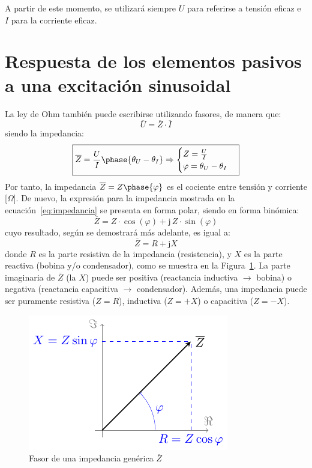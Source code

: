 \begin{remark}
  A partir de este momento, se utilizará siempre $U$ para referirse a
  tensión eficaz e $I$ para la corriente eficaz.
\end{remark}
	
\section{Respuesta de los elementos pasivos a una excitación
  sinusoidal}
	
La ley de Ohm también puede escribirse utilizando fasores, de manera
que:
\begin{equation}\label{eq:ohm_generalizada}
  \boxed{ \overline{U}=\overline{Z}\cdot\overline{I} }
\end{equation}
siendo la impedancia:
\begin{equation}\label{eq:impedancia}
  \boxed{\overline{Z} = \frac{U}{I}\phase{\theta_U - \theta_I} \Rightarrow 
    \begin{cases}
      Z = \frac{U}{I}\\
      \varphi = \theta_U - \theta_I
    \end{cases}}
\end{equation}
Por tanto, la impedancia $\overline{Z}=Z\phase{\varphi}$ es el cociente
entre tensión y corriente [$\Omega$]. De nuevo, la expresión para la
impedancia mostrada en la ecuación~\eqref{eq:impedancia} se presenta
en forma polar, siendo en forma binómica:
\begin{equation*}
  \overline{Z} = Z\cdot\cos(\varphi)+\mathrm{j}\,Z\cdot\sin(\varphi) %
\end{equation*}
cuyo resultado, según se demostrará más adelante, es igual a:
\begin{equation}
  \boxed{\overline{Z} =  R + \mathrm{j} X}
\end{equation}
donde $R$ es la parte resistiva de la impedancia (resistencia), y $X$
es la parte reactiva (bobina y/o condensador), como se muestra en la
Figura~\ref{fig:fasorimpedancia}. La parte imaginaria de
$\overline{Z}$ (la $X$) puede ser positiva (reactancia inductiva
$\rightarrow$ bobina) o negativa (reactancia capacitiva $\rightarrow$
condensador). Además, una impedancia puede ser puramente resistiva
($Z=R$), inductiva ($Z=+X$) o capacitiva ($Z=-X$).
\begin{figure}[H]
  \centering \includegraphics{../figs/fasorImpedancia.pdf}
  \caption{Fasor de una impedancia genérica $\overline{Z}$}
  \label{fig:fasorimpedancia}
\end{figure}
	
